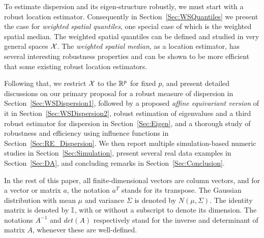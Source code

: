 To estimate dispersion and its eigen-structure robustly, we must start with a 
robust location 
estimator. Consequently in Section~\ref{Sec:WSQuantiles} we present the case for 
\textit{weighted spatial quantiles}, one special case of which is the weighted spatial 
median. The weighted spatial quantiles can be defined and studied in very general spaces 
$\mathcal{X}$. The \textit{weighted spatial median}, as a location estimator, 
has several interesting robustness properties and can be 
shown to be more efficient that some existing robust location estimators. 

Following that, we restrict $\mathcal{X}$ to the ${\mathbb{R}}^{p}$ for fixed $p$, and present detailed 
discussions on our primary proposal for a  robust measure of dispersion in 
Section~\ref{Sec:WSDispersion1}, followed by a proposed 
\textit{ affine equivariant version} of 
it in Section~\ref{Sec:WSDispersion2}, robust estimation of eigenvalues and a third 
robust estimator for dispersion in Section~\ref{Sec:Eigen}, and a thorough study of 
robustness and efficiency using influence functions in Section~\ref{Sec:RE_Dispersion}.
We then report multiple simulation-based numeric studies in Section~\ref{Sec:Simulation}, 
present several real data examples in Section~\ref{Sec:DA}, and concluding remarks in 
Section~\ref{Sec:Conclusion}.

In the rest of this paper, all finite-dimensional vectors are 
column vectors, and for a vector or matrix $a$, the notation $a^{T}$ stands for 
its transpose. The Gaussian distribution with mean $\mu$ and variance $\Sigma$ is denoted
by $N (\mu, \Sigma)$. The identity matrix  is denoted by ${\mathbb{I}}$, with or without a 
subscript to denote its dimension. The notations $A^{-1}$ and $det (A)$ respectively 
stand for the inverse and determinant of matrix $A$, whenever these are well-defined.

